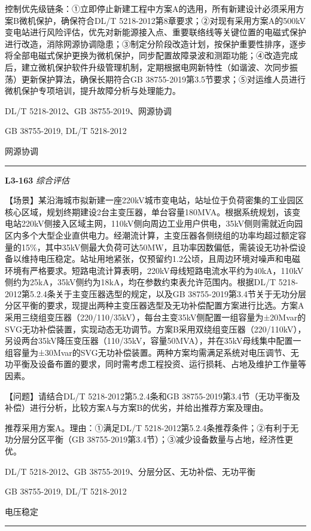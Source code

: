\documentclass[12pt,a4paper]{ctexart}
\begin{document}
\begin{description}[leftmargin=1.5em,style=nextline,font=\normalfont]
控制优先级链条：①立即停止新建工程中方案A的选用，所有新建设计必须采用方案B微机保护，确保符合DL/T 5218-2012第8章要求；②对现有采用方案A的500kV变电站进行风险评估，优先对新能源接入点、重要联络线等关键位置的电磁式保护进行改造，消除网源协调隐患；③制定分阶段改造计划，按保护重要性排序，逐步将全部电磁式保护更换为微机保护，同步配置故障录波和测距功能；④改造完成后，建立微机保护软件升级管理机制，定期根据电网新特性（如谐波、次同步振荡）更新保护算法，确保长期符合GB 38755-2019第3.5节要求；⑤对运维人员进行微机保护专项培训，提升故障分析与处理能力。
  \item[KW:] DL/T 5218-2012、GB 38755-2019、网源协调
  \item[Std:] GB 38755-2019, DL/T 5218-2012
  \item[Topic:] 网源协调
\end{description}
\vspace{4pt}
\hrule\vspace{6pt}

\noindent\textbf{L3-163} \hfill \textit{综合评估}
\begin{description}[leftmargin=1.5em,style=nextline,font=\normalfont]
  \item[Q:] 【场景】某沿海城市拟新建一座220kV城市变电站，站址位于负荷密集的工业园区核心区域，规划终期建设2台主变压器，单台容量180MVA。根据系统规划，该变电站220kV侧接入区域主网，110kV侧向周边工业用户供电，35kV侧则需就近向园区内多个大型企业直供电力。经潮流计算，主变压器各侧绕组的功率均超过额定容量的15\%，其中35kV侧最大负荷可达50MW，且功率因数偏低，需装设无功补偿设备以维持电压稳定。站址用地紧张，仅预留约1.2公顷，且周边环境对噪声和电磁环境有严格要求。短路电流计算表明，220kV母线短路电流水平约为40kA，110kV侧约为25kA，35kV侧约为18kA，均在参数约束表允许范围内。根据DL/T 5218-2012第5.2.4条关于主变压器选型的规定，以及GB 38755-2019第3.4节关于无功分层分区平衡的要求，现提出两种主变压器选型及无功补偿配置方案进行比选。方案A采用三绕组变压器（220/110/35kV），每台主变35kV侧配置一组容量为±20Mvar的SVG无功补偿装置，实现动态无功调节。方案B采用双绕组变压器（220/110kV），另设两台35kV降压变压器（110/35kV，容量50MVA），并在35kV母线集中配置一组容量为±30Mvar的SVG无功补偿装置。两种方案均需满足系统对电压调节、无功平衡及设备布置的要求，同时需考虑工程投资、运行损耗、占地及维护工作量等因素。

【问题】请结合DL/T 5218-2012第5.2.4条和GB 38755-2019第3.4节（无功平衡及补偿）进行分析，比较方案A与方案B的优劣，并给出推荐方案及理由。
  \item[A:] 推荐采用方案A。理由：①满足DL/T 5218-2012第5.2.4条推荐条件；②有利于无功分层分区平衡（GB 38755-2019第3.4节）；③减少设备数量与占地，经济性更优。
  \item[KW:] DL/T 5218-2012、GB 38755-2019、分层分区、无功补偿、无功平衡
  \item[Std:] GB 38755-2019, DL/T 5218-2012
  \item[Topic:] 电压稳定
\end{description}
\vspace{4pt}
\hrule\vspace{6pt}
\end{document}
